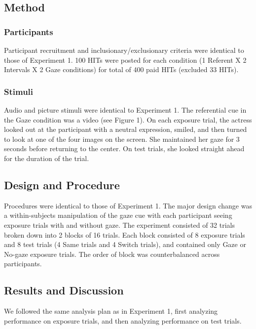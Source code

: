 \documentclass[authoryear, review]{elsarticle}
\begin{document}
\subsection{Method}\label{method-1}

\subsubsection{Participants}\label{participants-1}

Participant recruitment and inclusionary/exclusionary criteria were
identical to those of Experiment 1. 100 HITs were posted for each
condition (1 Referent X 2 Intervals X 2 Gaze conditions) for total of
400 paid HITs (excluded 33 HITs).

\subsubsection{Stimuli}\label{stimuli-1}

Audio and picture stimuli were identical to Experiment 1. The
referential cue in the Gaze condition was a video (see Figure 1). On
each exposure trial, the actress looked out at the participant with a
neutral expression, smiled, and then turned to look at one of the four
images on the screen. She maintained her gaze for 3 seconds before
returning to the center. On test trials, she looked straight ahead for
the duration of the trial.

\subsection{Design and Procedure}\label{design-and-procedure-1}

Procedures were identical to those of Experiment 1. The major design
change was a within-subjects manipulation of the gaze cue with each
participant seeing exposure trials with and without gaze. The experiment
consisted of 32 trials broken down into 2 blocks of 16 trials. Each
block consisted of 8 exposure trials and 8 test trials (4 Same trials
and 4 Switch trials), and contained only Gaze or No-gaze exposure
trials. The order of block was counterbalanced across participants.

\subsection{Results and Discussion}\label{results-and-discussion-1}

We followed the same analysis plan as in Experiment 1, first analyzing
performance on exposure trials, and then analyzing performance on test
trials.
\end{document}
